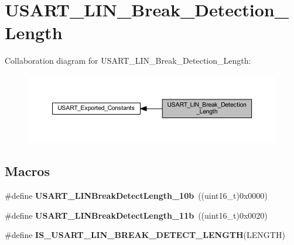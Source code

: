 \hypertarget{group___u_s_a_r_t___l_i_n___break___detection___length}{}\section{U\+S\+A\+R\+T\+\_\+\+L\+I\+N\+\_\+\+Break\+\_\+\+Detection\+\_\+\+Length}
\label{group___u_s_a_r_t___l_i_n___break___detection___length}
Collaboration diagram for U\+S\+A\+R\+T\+\_\+\+L\+I\+N\+\_\+\+Break\+\_\+\+Detection\+\_\+\+Length\+:\nopagebreak
\begin{figure}[H]
\begin{center}
\leavevmode
\includegraphics[width=350pt]{group___u_s_a_r_t___l_i_n___break___detection___length}
\end{center}
\end{figure}
\subsection*{Macros}
\begin{DoxyCompactItemize}
\item 
\mbox{\label{group___u_s_a_r_t___l_i_n___break___detection___length_gacfd0aabae8774239440e828c961ac2a0}} 
\#define {\bfseries U\+S\+A\+R\+T\+\_\+\+L\+I\+N\+Break\+Detect\+Length\+\_\+10b}~((uint16\+\_\+t)0x0000)
\item 
\mbox{\label{group___u_s_a_r_t___l_i_n___break___detection___length_gaf591cfcc859d67d71e6fa594eb5aec16}} 
\#define {\bfseries U\+S\+A\+R\+T\+\_\+\+L\+I\+N\+Break\+Detect\+Length\+\_\+11b}~((uint16\+\_\+t)0x0020)
\item 
\#define {\bfseries I\+S\+\_\+\+U\+S\+A\+R\+T\+\_\+\+L\+I\+N\+\_\+\+B\+R\+E\+A\+K\+\_\+\+D\+E\+T\+E\+C\+T\+\_\+\+L\+E\+N\+G\+TH}(L\+E\+N\+G\+TH)
\end{DoxyCompactItemize}


